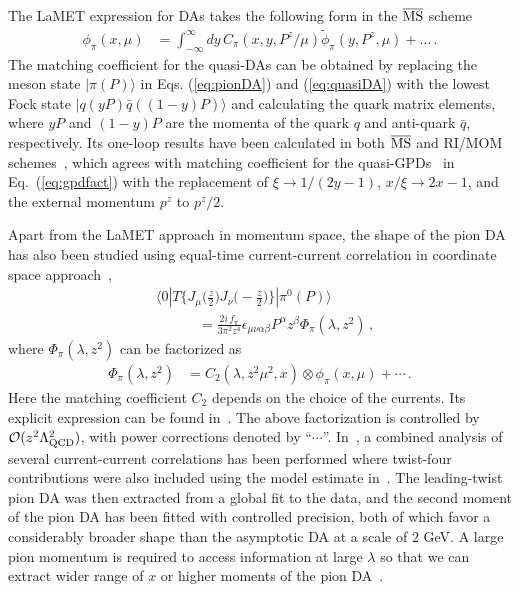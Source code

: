 \documentclass[aps,rmp,reprint,amsmath,amssymb,graphicx,longbibliography]{revtex4-1} %
\newcommand{\MS}{{\overline{\rm MS}}}
\newcommand{\nn}{\nonumber}
\DeclareRobustCommand{\eq}[1]{Eq.~(\ref{eq:#1})}
\begin{document}
The LaMET expression for DAs takes the following form in the $\MS$ scheme~\cite{Ji:2015qla,Liu:2018tox}
\begin{align}\label{eq:matching2}
	\phi_\pi(x,\mu) &=\int_{-\infty}^\infty dy\, C_{\pi}\left(x,y,P^z/\mu\right) \tilde\phi_\pi(y,P^z,\mu)+\ldots\,.
\end{align}
The matching coefficient  for the quasi-DAs can be obtained by replacing the meson state $| \pi(P)\rangle$ in Eqs. (\ref{eq:pionDA}) and (\ref{eq:quasiDA}) with the lowest Fock state $| q(y P) \bar q((1-y)P)\rangle$ and calculating the quark matrix elements, where $y P$ and $(1-y)P$ are the momenta of the quark $q$ and anti-quark $\bar q$, respectively. Its one-loop results have been calculated in both $\MS$ and RI/MOM schemes~\cite{Liu:2018tox}, which agrees with matching coefficient for the quasi-GPDs~\cite{Ji:2015qla,Xiong:2015nua,Liu:2019urm} in \eq{gpdfact} with the replacement of $\xi\to 1/(2y-1)$, $x/\xi\to 2x-1$, and the external momentum $p^z$ to $p^z/2$.

Apart from the LaMET approach in momentum space,
the shape of the pion DA has also been studied using equal-time current-current correlation in coordinate space approach~\cite{Bali:2017gfr,Bali:2018spj},
\begin{align}
	&\langle 0 | T\Big\{J_\mu\Big(\frac{z}{2}\Big) J_\nu\Big(-\frac{z}{2}\Big)\Big\}| \pi^0(P)\rangle \nn\\
	& \hspace{3em}= \frac{2i\, f_\pi}{3 \pi^2 z^4} \epsilon_{\mu\nu\alpha\beta} P^\alpha z^\beta \Phi_\pi(\lambda, z^2)\,,
	\label{eq:pigg-in-z-space}
\end{align}
where $\Phi_\pi(\lambda, z^2)$ can be factorized as
\begin{align} \label{twist_decomposition_heuristic}
	\Phi_\pi(\lambda, z^2) &= C_2 (\lambda,z^2\mu^2, x)\otimes \phi_\pi(x,\mu)+\cdots\,.
\end{align}
Here the matching coefficient $C_2$ depends  on the choice of the currents. Its explicit expression can be found in~\cite{Bali:2018spj}.
The above factorization is controlled by ${\mathcal O}(z^2\Lambda_{\rm QCD}^2)$, with power corrections denoted by ``$\cdots$''. In~\cite{Bali:2018spj}, a combined analysis of several current-current correlations has been performed where twist-four contributions were also included using the model estimate in~\cite{Braun:1989iv,Ball:2006wn}. {The leading-twist pion DA was then extracted from a global fit to the data, and the second moment of the pion DA has been fitted with controlled precision}, both of which favor a considerably broader shape than the asymptotic DA at a scale of $2$ GeV.
A large pion momentum is required to access information at large $\lambda$ so that we can extract wider range of $x$ or higher moments of the pion DA~\cite{Bali:2017gfr}.
\end{document}
